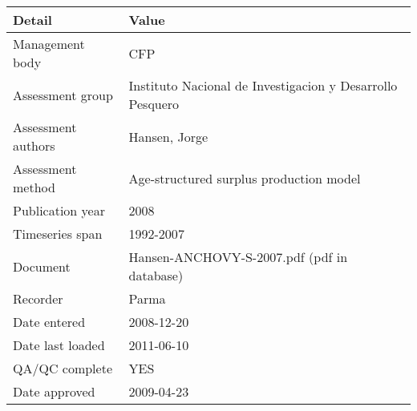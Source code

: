 \begin{table}[htb]
\centering
\begin{tabular}{lp{7cm}}
\toprule
Detail & Value \\
\midrule
Management body    & CFP                                                       \\
Assessment group   & Instituto Nacional de Investigacion y Desarrollo Pesquero \\
Assessment authors & Hansen, Jorge                                             \\
Assessment method  & Age-structured surplus production model                   \\
Publication year   & 2008                                                      \\
Timeseries span    & 1992-2007                                                 \\
Document           & Hansen-ANCHOVY-S-2007.pdf (pdf in database)               \\
Recorder           & Parma                                                     \\
Date entered       & 2008-12-20                                                \\
Date last loaded   & 2011-06-10                                                \\
QA/QC complete     & YES                                                       \\
Date approved      & 2009-04-23                                                \\
\bottomrule
\end{tabular}
\label{tab:assessdet}
\end{table}
